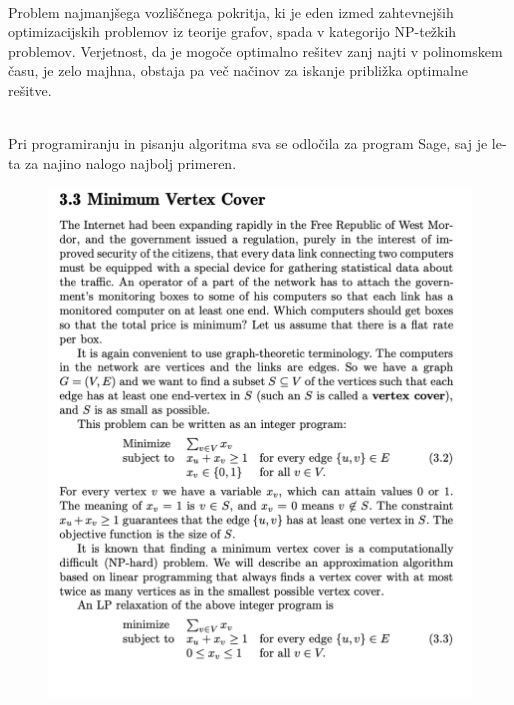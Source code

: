 \documentclass[12pt,a4paper]{amsart}
\theoremstyle{definition} %
\theoremstyle{plain} %
\begin{document}
\hspace*{\fill} %
\\
Problem najmanjšega vozliščnega pokritja, ki je eden izmed zahtevnejših optimizacijskih problemov iz teorije grafov, spada v kategorijo NP-težkih problemov. Verjetnost, da je mogoče optimalno rešitev zanj najti v polinomskem času, je zelo majhna, obstaja pa več načinov za iskanje približka optimalne rešitve. 

\hspace*{\fill} %
\\
Pri programiranju in pisanju algoritma sva se odločila za program Sage, saj je le-ta za najino nalogo najbolj primeren.

\newpage

\begin{figure}[ht]
\centering
\includegraphics[width=1\textwidth]{Picture1.png}
\end{figure}

\newpage
\end{document}

